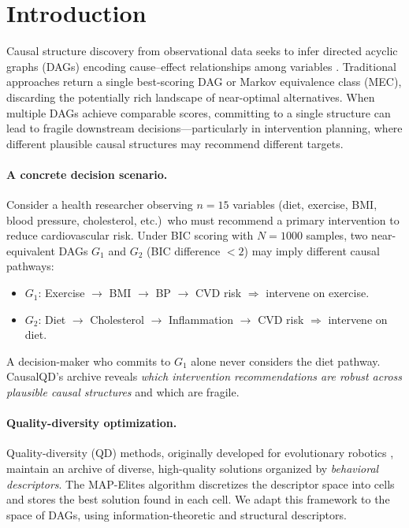 \documentclass{article}
\theoremstyle{definition}
\theoremstyle{plain}
\theoremstyle{remark}
\begin{document}
\section{Introduction}
\label{sec:intro}

Causal structure discovery from observational data seeks to infer directed
acyclic graphs (DAGs) encoding cause--effect relationships among variables
\citep{spirtes2000causation, pearl2009causality}. Traditional approaches return a
single best-scoring DAG or Markov equivalence class (MEC), discarding the
potentially rich landscape of near-optimal alternatives. When multiple DAGs
achieve comparable scores, committing to a single structure can lead to fragile
downstream decisions---particularly in intervention planning, where different
plausible causal structures may recommend different targets.

\paragraph{A concrete decision scenario.}
Consider a health researcher observing $n = 15$ variables (diet, exercise, BMI,
blood pressure, cholesterol, etc.)\ who must recommend a primary intervention to
reduce cardiovascular risk. Under BIC scoring with $N = 1000$ samples, two
near-equivalent DAGs $G_1$ and $G_2$ (BIC difference $< 2$) may imply different
causal pathways:
\begin{itemize}
  \item $G_1$: Exercise $\to$ BMI $\to$ BP $\to$ CVD risk
        $\Longrightarrow$ intervene on exercise.
  \item $G_2$: Diet $\to$ Cholesterol $\to$ Inflammation $\to$ CVD risk
        $\Longrightarrow$ intervene on diet.
\end{itemize}
A decision-maker who commits to $G_1$ alone never considers the diet pathway.
CausalQD's archive reveals \emph{which intervention recommendations are robust
across plausible causal structures} and which are fragile.

\paragraph{Quality-diversity optimization.}
Quality-diversity (QD) methods, originally developed for evolutionary robotics
\citep{mouret2015illuminating, cully2015robots}, maintain an archive of diverse,
high-quality solutions organized by \emph{behavioral descriptors}. The MAP-Elites
algorithm \citep{mouret2015illuminating} discretizes the descriptor space into
cells and stores the best solution found in each cell. We adapt this framework to
the space of DAGs, using information-theoretic and structural descriptors.
\end{document}
